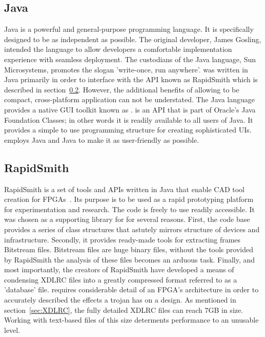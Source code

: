 \subsection{Java} \label{sec:java}
Java is a powerful and general-purpose programming language. 
It is specifically designed to be as independent as possible.
The original developer, James Gosling, intended the language to allow developers a comfortable implementation experience with seamless deployment. 
The custodians of the Java language, Sun Microsystems, promotes the slogan 'write-once, run anywhere'.  
\Name was written in Java primarily in order to interface with the \acrshort{API} known as RapidSmith which is described in section~\ref{sec:rapidSmith}.
However, the additional benefits of allowing \Name to be compact, cross-platform application can not be understated.
The Java language provides a native \acrfull{GUI} toolkit known as \Swing.
\Swing is an \acrshort{API} that is part of Oracle's Java Foundation Classes; in other words it is readily available to all users of Java.
It provides a simple to use programming structure for creating sophisticated \acrshort{UIs}.
\Name employs Java and Java \Swing to make it as user-friendly as possible. 

\subsection{RapidSmith} \label{sec:rapidSmith}
RapidSmith is a set of tools and \acrfull{APIs} written in Java that enable \acrfull{CAD} tool creation for \Xilinx \acrshort{FPGA}s~\cite{rapidSmith}.
Its purpose is to be used as a rapid prototyping platform for experimentation and research.
The code is freely to use readily accessible.
It was chosen as a supporting library for \Name for several reasons.
First, the code base provides a series of class structures that astutely mirrors structure of \Xilinx devices and infrastructure.
Secondly, it provides ready-made tools for extracting frames \gls{Bitstream} files. 
\gls{Bitstream} files are huge binary files, without the tools provided by RapidSmith the analysis of these files becomes an arduous task.
Finally, and most importantly, the creators of RapidSmith have developed a means of condensing XDLRC files into a greatly compressed format referred to as a 'database' file.
\Name requires considerable detail of an \acrshort{FPGA}'s architecture in order to accurately described the effects a trojan has on a design.
As mentioned in section~\ref{sec:XDLRC}, the fully detailed XDLRC files can reach 7GB in size.
Working with text-based files of this size determents performance to an unusable level.
